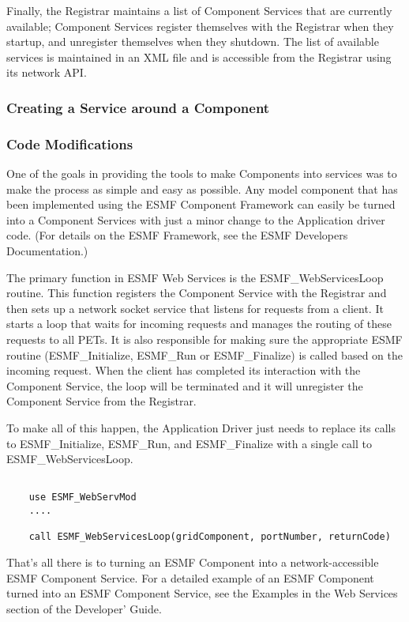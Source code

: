 Finally, the Registrar maintains a list of Component Services that are currently 
available;  Component Services register themselves with the Registrar when they 
startup, and unregister themselves when they shutdown.  The list of available services 
is maintained in an XML file and is accessible from the Registrar using its network API.

\subsubsection{Creating a Service around a Component}
\subsubsection{Code Modifications}
One of the goals in providing the tools to make Components into services was to make 
the process as simple and easy as possible.  Any model component that has been 
implemented using the ESMF Component Framework can easily be turned into a 
Component Services with just a minor change to the Application 
driver code.  (For details on the ESMF Framework, see the ESMF Developers Documentation.)

The primary function in ESMF Web Services is the ESMF\_WebServicesLoop routine.  This 
function registers the Component Service with the Registrar and then sets up a 
network socket service that listens for requests from a client.  It starts a loop 
that waits for incoming requests and manages the routing of these requests to 
all PETs.  It is also responsible for making sure the appropriate ESMF 
routine (ESMF\_Initialize, ESMF\_Run or ESMF\_Finalize) is called based on the incoming 
request. When the client has completed its interaction with the Component Service, 
the loop will be terminated and it will unregister the Component Service from the Registrar. 

To make all of this happen, the Application Driver just needs to replace its calls to 
ESMF\_Initialize, ESMF\_Run, and ESMF\_Finalize with a single call to ESMF\_WebServicesLoop. 

\begin{verbatim}

	use ESMF_WebServMod
	....

	call ESMF_WebServicesLoop(gridComponent, portNumber, returnCode)

\end{verbatim}

That's all there is to turning an ESMF Component into a network-accessible 
ESMF Component Service.  For a detailed example of an ESMF Component turned into 
an ESMF Component Service, see the Examples in the Web Services section of the 
Developer' Guide.

